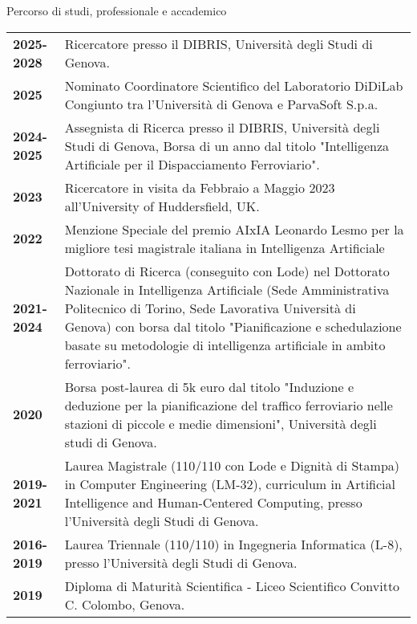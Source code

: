 \documentclass{resume} %
\begin{document}

\begin{rSection}{Percorso di studi, professionale e accademico}

\begin{tabularx}{0.95\textwidth} {lp{14cm}}
 \textbf{2025-2028} & Ricercatore presso il DIBRIS, Università degli Studi di Genova.  \\
 \textbf{2025} & Nominato Coordinatore Scientifico del Laboratorio DiDiLab Congiunto tra l'Università di Genova e ParvaSoft S.p.a.  \\
 \textbf{2024-2025} & Assegnista di Ricerca presso il DIBRIS, Università degli Studi di Genova, Borsa di un anno dal titolo "Intelligenza Artificiale per il Dispacciamento Ferroviario".  \\
 \textbf{2023}  & Ricercatore in visita da Febbraio a Maggio 2023 all'University of Huddersfield, UK.\\
  \textbf{2022}  & Menzione Speciale del premio AIxIA Leonardo Lesmo per la migliore tesi magistrale italiana in Intelligenza Artificiale\\
 \textbf{2021-2024}  & Dottorato di Ricerca (conseguito con Lode) nel Dottorato Nazionale in Intelligenza Artificiale (Sede Amministrativa Politecnico di Torino, Sede Lavorativa Università di Genova) con borsa dal titolo "Pianificazione e schedulazione basate su metodologie di intelligenza artificiale in ambito ferroviario".\\
 \textbf{2020} & Borsa post-laurea di 5k euro dal titolo "Induzione e deduzione per la pianificazione del traffico ferroviario nelle stazioni di piccole e medie dimensioni", Università degli studi di Genova. \\
 \textbf{2019-2021}  & Laurea Magistrale (110/110 con Lode e Dignità di Stampa) in Computer Engineering (LM-32), curriculum in Artificial Intelligence and Human-Centered Computing, presso l'Università degli Studi di Genova.  \\
 \textbf{2016-2019}  & Laurea Triennale (110/110) in Ingegneria Informatica (L-8), presso l'Università degli Studi di Genova. \\
 \textbf{2019}  & Diploma di Maturità Scientifica - Liceo Scientifico Convitto C. Colombo, Genova. 
\end{tabularx}
\end{rSection}
\end{document}

